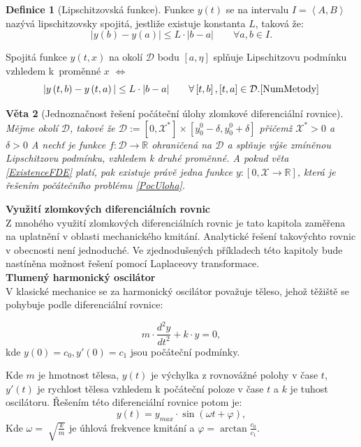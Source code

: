 \documentclass[a4paper,12pt,twoside]{article}
\newtheorem{veta}{Věta}[section]
\theoremstyle{definition}
\newtheorem{defin}[veta]{Definice}
\theoremstyle{remark}
\numberwithin{equation}{section}
\numberwithin{table}{section}
\numberwithin{figure}{section}
\newcommand{\R}{\mathbb{R}}
\begin{document}
\begin{defin}[Lipschitzovská funkce]
	Funkce $y\left(t\right)$ se na intervalu $I = \left\langle A, B \right\rangle $ nazývá lipschitzovsky spojitá, jestliže existuje konstanta $L$, taková že:
	$$|y\left(b\right)- y\left(a\right)| \leq L \cdot |b-a| \qquad  \forall a,b \in I.$$
\end{defin}

Spojitá funkce  $y\left(t,x\right)$ na okolí $\mathcal{D}$ bodu $\left[a, \eta\right]$ splňuje Lipschitzovu podmínku vzhledem k~proměnné $x$ $\Leftrightarrow$ 
$$ |y\left(t, b\right)- y\left( t, a\right)| \leq L \cdot |b-a| \qquad  \forall \left[t,b\right], \left[t,a\right]  \in \mathcal{D}. \cite{NumMetody} $$

\begin{veta} [Jednoznačnost řešení počáteční úlohy zlomkové diferenciální rovnice]
	Mějme okolí $\mathcal{D}$, takové že $\mathcal{D} := \left[0,\mathcal{X} ^{*}\right] \times \left[y_{0}^{0} - \delta , y_{0}^{0} + \delta \right] $ přičemž $\mathcal{X}^{*} > 0$ a $\delta > 0$ A nechť je funkce $f: \mathcal{D} \to \R$ ohraničená na $\mathcal{D}$ a splňuje výše zmíněnou Lipschitzovu podmínku, vzhledem k druhé proměnné. A pokud věta \ref{ExistenceFDE} platí, pak existuje právě jedna funkce $y:\left[0, \mathcal{X} \to \R\right]$, která je řešením počátečního problému \eqref{PocUloha}.
\end{veta}
\textbf{Využití zlomkových diferenciálních rovnic}\\
Z mnohého využití  zlomkových diferenciálních rovnic je tato kapitola zaměřena na uplatnění v oblasti mechanického kmitání. Analytické řešení takovýchto rovnic v obecnosti není jednoduché. Ve zjednodušených příkladech této kapitoly bude nastíněna možnost řešení pomocí Laplaceovy transformace.\\
\textbf{Tlumený harmonický oscilátor} \label{TlumenyHarmonickyOscilator}\\
V klasické mechanice se za harmonický oscilátor považuje těleso, jehož těžiště se pohybuje podle diferenciální rovnice:

\begin{equation} \label{HarmonicOscilator}
	m \cdot \frac{d^{2} y}{d t^{2}} + k \cdot y = 0,	
\end{equation}
kde $y\left(0\right) = c_{0}, y'\left(0\right) = c_{1}$ jsou počáteční podmínky. 

Kde $m$ je hmotnost tělesa, $y\left(t\right)$ je výchylka z rovnovážné polohy v čase $t$, $y'\left(t\right)$ je rychlost tělesa vzhledem k počáteční poloze v čase $t$ a $k$ je tuhost oscilátoru.
Řešením této diferenciální rovnice potom je:
\begin{equation}
	y\left(t\right)  = y_{max} \cdot \sin{\left(\omega t + \varphi\right)},
\end{equation}
Kde $\omega = \sqrt[]{\frac{k}{m}}$ je úhlová frekvence kmitání a $\varphi = \arctan{\frac{c_{0}}{c_{1}}}$. \cite{HRW} \cite{Fyzika1Kulhanek}
\end{document}
